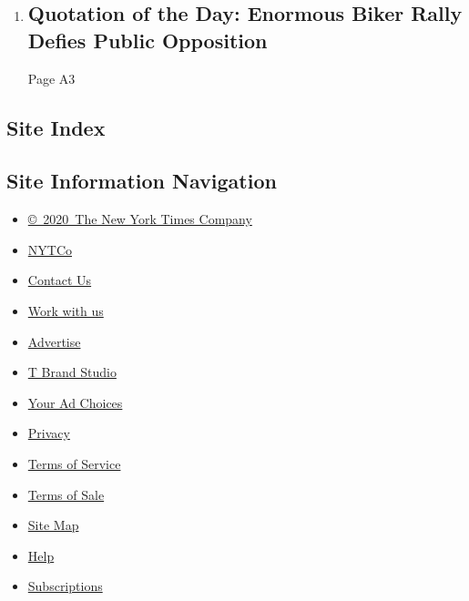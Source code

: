 \begin{enumerate}
\def\labelenumi{\arabic{enumi}.}
\item
  \href{/2020/08/06/todayspaper/quotation-of-the-day-enormous-biker-rally-defies-public-opposition.html}{}

  \hypertarget{quotation-of-the-day-enormous-biker-rally-defies-public-opposition}{%
  \subsection{Quotation of the Day: Enormous Biker Rally Defies Public
  Opposition}\label{quotation-of-the-day-enormous-biker-rally-defies-public-opposition}}

  Page A3
\end{enumerate}

\hypertarget{site-index}{%
\subsection{Site Index}\label{site-index}}

\hypertarget{site-information-navigation}{%
\subsection{Site Information
Navigation}\label{site-information-navigation}}

\begin{itemize}
\tightlist
\item
  \href{https://help.nytimes3xbfgragh.onion/hc/en-us/articles/115014792127-Copyright-notice}{©~2020~The
  New York Times Company}
\end{itemize}

\begin{itemize}
\tightlist
\item
  \href{https://www.nytco.com/}{NYTCo}
\item
  \href{https://help.nytimes3xbfgragh.onion/hc/en-us/articles/115015385887-Contact-Us}{Contact
  Us}
\item
  \href{https://www.nytco.com/careers/}{Work with us}
\item
  \href{https://nytmediakit.com/}{Advertise}
\item
  \href{http://www.tbrandstudio.com/}{T Brand Studio}
\item
  \href{https://www.nytimes3xbfgragh.onion/privacy/cookie-policy\#how-do-i-manage-trackers}{Your
  Ad Choices}
\item
  \href{https://www.nytimes3xbfgragh.onion/privacy}{Privacy}
\item
  \href{https://help.nytimes3xbfgragh.onion/hc/en-us/articles/115014893428-Terms-of-service}{Terms
  of Service}
\item
  \href{https://help.nytimes3xbfgragh.onion/hc/en-us/articles/115014893968-Terms-of-sale}{Terms
  of Sale}
\item
  \href{https://spiderbites.nytimes3xbfgragh.onion}{Site Map}
\item
  \href{https://help.nytimes3xbfgragh.onion/hc/en-us}{Help}
\item
  \href{https://www.nytimes3xbfgragh.onion/subscription?campaignId=37WXW}{Subscriptions}
\end{itemize}
